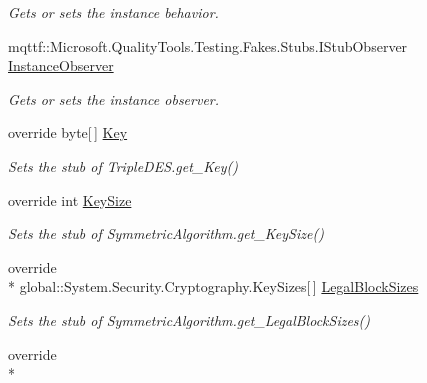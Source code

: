 \begin{DoxyCompactItemize}
\begin{DoxyCompactList}\small\item\em Gets or sets the instance behavior.\end{DoxyCompactList}\item 
mqttf\-::\-Microsoft.\-Quality\-Tools.\-Testing.\-Fakes.\-Stubs.\-I\-Stub\-Observer \hyperlink{class_system_1_1_security_1_1_cryptography_1_1_fakes_1_1_stub_triple_d_e_s_a18560a12306bf7ab3f40a8b0f0e8795e}{Instance\-Observer}
\begin{DoxyCompactList}\small\item\em Gets or sets the instance observer.\end{DoxyCompactList}\item 
override byte\mbox{[}$\,$\mbox{]} \hyperlink{class_system_1_1_security_1_1_cryptography_1_1_fakes_1_1_stub_triple_d_e_s_af5a79ccb5fc3933f77ed8e5a08739281}{Key}
\begin{DoxyCompactList}\small\item\em Sets the stub of Triple\-D\-E\-S.\-get\-\_\-\-Key()\end{DoxyCompactList}\item 
override int \hyperlink{class_system_1_1_security_1_1_cryptography_1_1_fakes_1_1_stub_triple_d_e_s_a3ebc35a3b708d68bb6e766b998b5b8a1}{Key\-Size}
\begin{DoxyCompactList}\small\item\em Sets the stub of Symmetric\-Algorithm.\-get\-\_\-\-Key\-Size()\end{DoxyCompactList}\item 
override \\*
global\-::\-System.\-Security.\-Cryptography.\-Key\-Sizes\mbox{[}$\,$\mbox{]} \hyperlink{class_system_1_1_security_1_1_cryptography_1_1_fakes_1_1_stub_triple_d_e_s_a7453edcf439bc43628be285d9a277909}{Legal\-Block\-Sizes}
\begin{DoxyCompactList}\small\item\em Sets the stub of Symmetric\-Algorithm.\-get\-\_\-\-Legal\-Block\-Sizes()\end{DoxyCompactList}\item 
override \\*

\end{DoxyCompactItemize}
